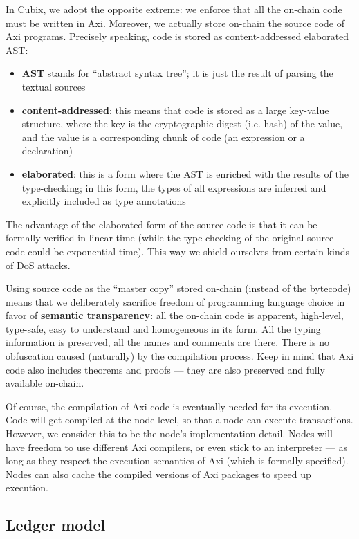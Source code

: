 \documentclass[a4paper]{article}
\begin{document}
In Cubix, we adopt the opposite extreme: we enforce that all the on-chain code must be written in Axi. Moreover, we actually store on-chain the source code of Axi programs. Precisely speaking, code is stored as content-addressed elaborated AST:

\begin{itemize}
  \item \textbf{AST} stands for ``abstract syntax tree''; it is just the result of parsing the textual sources
  \item \textbf{content-addressed}: this means that code is stored as a large key-value structure, where the key is the cryptographic-digest (i.e. hash) of the value, and the value is a corresponding chunk of code (an expression or a declaration)
  \item \textbf{elaborated}: this is a form where the AST is enriched with the results of the type-checking; in this form, the types of all expressions are inferred and explicitly included as type annotations
\end{itemize}

The advantage of the elaborated form of the source code is that it can be formally verified in linear time (while the type-checking of the original source code could be exponential-time). This way we shield ourselves from certain kinds of DoS attacks.

Using source code as the ``master copy'' stored on-chain (instead of the bytecode) means that we deliberately sacrifice freedom of programming language choice in favor of \textbf{semantic transparency}: all the on-chain code is apparent, high-level, type-safe, easy to understand and homogeneous in its form. All the typing information is preserved, all the names and comments are there. There is no obfuscation caused (naturally) by the compilation process. Keep in mind that Axi code also includes theorems and proofs --- they are also preserved and fully available on-chain.

Of course, the compilation of Axi code is eventually needed for its execution. Code will get compiled at the node level, so that a node can execute transactions. However, we consider this to be the node's implementation detail. Nodes will have freedom to use different Axi compilers, or even stick to an interpreter --- as long as they respect the execution semantics of Axi (which is formally specified). Nodes can also cache the compiled versions of Axi packages to speed up execution.

\subsection{Ledger model}
\end{document}
